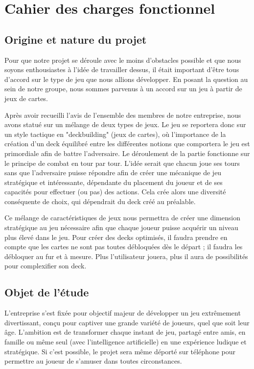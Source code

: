 \documentclass[12pt,a4paper]{article}
\begin{document}
\section{Cahier des charges fonctionnel}

\subsection{Origine et nature du projet}
Pour que notre projet se déroule avec le moins d'obstacles possible et que nous soyons enthousiastes à l'idée de travailler dessus, il était important d'être tous d'accord sur le type de jeu que nous allions développer. En posant la question au sein de notre groupe, nous sommes parvenus à un accord sur un jeu à partir de jeux de cartes.

Après avoir recueilli l'avis de l'ensemble des membres de notre entreprise, nous avons statué sur un mélange de deux types de jeux. Le jeu se reportera donc sur un style tactique en "deckbuilding" (jeux de cartes), où l'importance de la création d'un deck équilibré entre les différentes notions que comportera le jeu est primordiale afin de battre l'adversaire. Le déroulement de la partie fonctionne sur le principe de combat en tour par tour. L'idée serait que chacun joue ses tours sans que l'adversaire puisse répondre afin de créer une mécanique de jeu stratégique et intéressante, dépendante du placement du joueur et de ses capacités pour effectuer (ou pas) des actions. Cela crée alors une diversité conséquente de choix, qui dépendrait du deck créé au préalable.

Ce mélange de caractéristiques de jeux nous permettra de créer une dimension stratégique au jeu nécessaire afin que chaque joueur puisse acquérir un niveau plus élevé dans le jeu. Pour créer des decks optimisés, il faudra prendre en compte que les cartes ne sont pas toutes débloquées dès le départ ; il faudra les débloquer au fur et à mesure. Plus l'utilisateur jouera, plus il aura de possibilités pour complexifier son deck.
\clearpage


\subsection{Objet de l'étude}
L'entreprise s'est fixée pour objectif majeur de développer un jeu extrêmement divertissant, conçu pour captiver une grande variété de joueurs, quel que soit leur âge. L'ambition est de transformer chaque instant de jeu, partagé entre amis, en famille ou même seul (avec l'intelligence artificielle) en une expérience ludique et stratégique. Si c'est possible, le projet sera même déporté sur téléphone pour permettre au joueur de s'amuser dans toutes circonstances.
\end{document}
